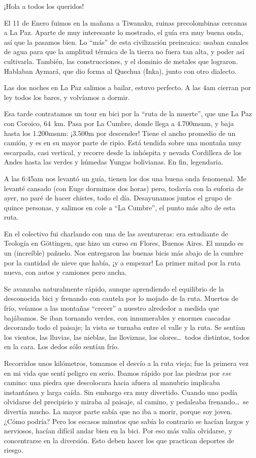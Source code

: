 ¡Hola a todos los queridos!

El 11 de Enero fuimos en la mañana a Tiwanaku, ruinas precolombinas cercanas a
La Paz. Aparte de muy interesante lo mostrado, el guía era muy buena onda, así
que la pasamos bien. Lo ``más'' de esta civilización preincaica: usaban
canales de agua para que la amplitud térmica de la tierra no fuera tan alta, y
poder así cultivarla. También, las construcciones, y el dominio de metales que
lograron. Hablaban Aymará, que dio forma al Quechua (Inka), junto con otro
dialecto.

Las dos noches en La Paz salimos a bailar, estuvo perfecto. A las 4am cierran
por ley todos los bares, y volvíamos a dormir.

Esa tarde contratamos un tour en bici por la ``ruta de la muerte'', que une La
Paz con Coroico, 64~km. Pasa por La Cumbre, donde llega a 4.700msnm, y baja
hasta los 1.200msnm: ¡3.500m por descender! Tiene el ancho
promedio de un camión, y es en su mayor parte de ripio. Está tendida sobre una
montaña muy escarpada, casi vertical, y recorre desde la inhóspita y nevada
Cordillera de los Andes hasta las verdes y húmedas Yungas bolivianas. En fin,
legendaria.

A las 6:45am nos levantó un guía, tienen los dos una buena onda fenomenal. Me
levanté cansado (con Euge dormimos dos horas) pero, todavía con la euforia de
ayer, no paré de hacer chistes, todo el día. Desayunamos juntos el grupo de
quince personas, y salimos en cole a ``La Cumbre'', el punto más alto de esta
ruta.

En el colectivo fui charlando con una de las aventureras: era estudiante de
Teología en G\"ottingen, que hizo un curso en Flores, Buenos Aires. El mundo es
un (increíble) pañuelo. Nos entregaron las buenas bicis más abajo de la
cumbre por la cantidad de nieve que había, ¡y a empezar! La
primer mitad por la ruta nueva, con autos y camiones pero ancha.

Se avanzaba naturalmente rápido, aunque aprendiendo el equilibrio de la
desconocida bici y frenando con cautela por lo mojado de la ruta. Muertos de
frío, veíamos a las montañas ``crecer'' a nuestro alrededor a medida que
bajábamos. Se iban tornando verdes, con innumerables y enormes cascadas
decorando todo el paisaje; la vista se turnaba entre el valle y la ruta. Se
sentían los vientos, las lluvias, las nieblas, las lloviznas, los olores\ldots\
todos distintos, todos en la cara. Los dedos sólo sentían frío.

Recorridos unos kilómetros, tomamos el desvío a la ruta vieja; fue la primera
vez en mi vida que sentí peligro en serio. Ibamos rápido por las piedras por
\emph{ese} camino: una piedra que descolocara hacia afuera al manubrio implicaba
instantánea y larga caída. Sin embargo era muy divertido. Cuando uno podía
olvidarse del precipicio y miraba al paisaje, al camino, y pedaleaba
frenando\ldots\ se divertía mucho. La mayor parte sabía que no iba a morir,
porque soy joven. ¿Cómo podría? Pero los escasos minutos que
sabía lo contrario se hacían largos y nerviosos, hacían difícil andar bien
en la bici. Por eso más valía olvidarse, y concentrarse en la diversión. Esto
deben hacer los que practican deportes de riesgo.

